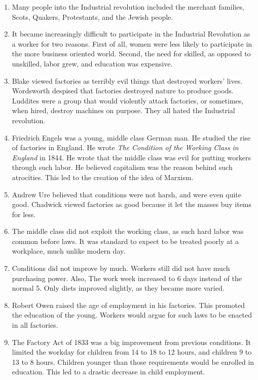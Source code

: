 \documentclass[12pt]{article}
\begin{document}
\begin{enumerate}
\item Many people into the Industrial revolution included the merchant families, Scots, Quakers, Protestants, and the Jewish people.

\item It became increasingly difficult to participate in the Industrial Revolution as a worker for two reasons. First of all, women were less likely to participate in the more business oriented world. Second, the need for skilled, as opposed to unskilled, labor grew, and education was expensive.

\item Blake viewed factories as terribly evil things that destroyed workers' lives. Wordsworth despised that factories destroyed nature to produce goods. Luddites were a group that would violently attack factories, or sometimes, when hired, destroy machines on purpose. They all hated the Industrial revolution.

\item Friedrich Engels was a young, middle class German man. He studied the rise of factories in England. He wrote \textit{The Condition of the Working Class in England} in 1844. He wrote that the middle class was evil for putting workers through such labor. He believed capitalism was the reason behind such atrocities. This led to the creation of the idea of Marxism.

\item Andrew Ure believed that conditions were not harsh, and were even quite good. Chadwick viewed factories as good because it let the masses buy items for less.

\item The middle class did not exploit the working class, as such hard labor was common before laws. It was standard to expect to be treated poorly at a workplace, much unlike modern day.

\item Conditions did not improve by much. Workers still did not have much purchasing power. Also, The work week increased to 6 days instead of the normal 5. Only diets improved slightly, as they became more varied.

\item Robert Owen raised the age of employment in his factories. This promoted the education of the young. Workers would argue for such laws to be enacted in all factories.

\item The Factory Act of 1833 was a big improvement from previous conditions. It limited the workday for children from 14 to 18 to 12 hours, and children 9 to 13 to 8 hours. Children younger than those requirements would be enrolled in education. This led to a drastic decrease in child employment.


\end{enumerate}
\end{document}
